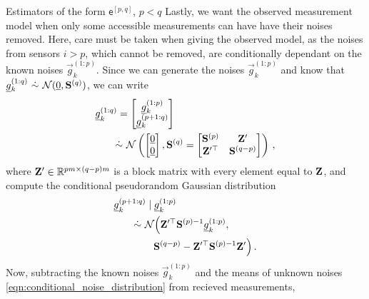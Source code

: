 \documentclass[conference]{IEEEtran}
\theoremstyle{definition}
\theoremstyle{remark}
\begin{document}
\begin{LaTeXdescription}
  \item[Estimators of the form $\mathsf{e}^{[p,q]}$, $p<q$] Lastly, we want the observed measurement model when only some accessible measurements can have have their noises removed. Here, care must be taken when giving the observed model, as the noises from sensors $i>p$, which cannot be removed, are conditionally dependant on the known noises $\vec{g}_k^{(1:p)}$. Since we can generate the noises $\vec{g}_k^{(1:p)}$ and know that $\vec{g}_k^{(1:q)}\ \dot{\sim}\ \mathcal{N}(\vec{0}, \mat{S}^{(q)})$, we can write 
  \begin{equation}\label{eqn:block_noises_and_correlation}
    \begin{split}
      &\vec{g}_k^{(1:q)}=
      \begin{bmatrix}
        \vec{g}_k^{(1:p)}\\
        \vec{g}_k^{(p+1:q)}\\
      \end{bmatrix}\\ 
      &\qquad \dot{\sim}\ \mathcal{N}\left(
      \begin{bmatrix}
        \vec{0}\\
        \vec{0}
      \end{bmatrix},\mat{S}^{(q)}=
      \begin{bmatrix}
        \mat{S}^{(p)} & \mat{Z}^\prime\\
        \mat{Z}^{\prime\top} & \mat{S}^{(q-p)}
      \end{bmatrix}\right)\,,
    \end{split}
  \end{equation}
  where ${{\mathbf{Z}}}^\prime \in \mathbb{R}^{pm \times (q-p)m}$ is a block matrix with every element equal to ${{\mathbf{Z}}}$, and compute the conditional pseudorandom Gaussian distribution
  \begin{equation}\label{eqn:conditional_noise_distribution}
    \begin{split}
      &\vec{g}_k^{(p+1:q)} \mid \vec{g}_k^{(1:p)}\\
      &\qquad \dot{\sim}\ \mathcal{N}\Big(\mat{Z}^{\prime\top}\mat{S}^{(p)-1}\vec{g}_k^{(1:p)},\\
      &\qquad\qquad \mat{S}^{(q-p)} - \mat{Z}^{\prime\top}\mat{S}^{(p)-1}\mat{Z}^{\prime}\Big)\,.
    \end{split}
  \end{equation}
  Now, subtracting the known noises $\vec{g}_k^{(1:p)}$ and the means of unknown noises \eqref{eqn:conditional_noise_distribution} from recieved measurements,

\end{LaTeXdescription}
\end{document}
